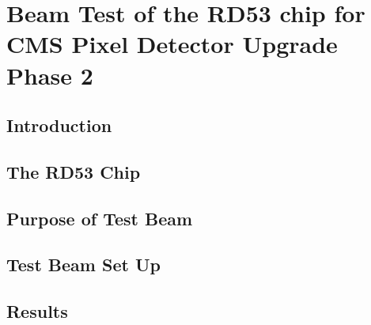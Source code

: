 \chapter{Beam Test of the RD53 chip for CMS Pixel Detector Upgrade Phase 2}\label{ch:testbeam}

\section{Introduction}
\section{The RD53 Chip}
\section{Purpose of Test Beam}
\section{Test Beam Set Up}
\section{Results}
